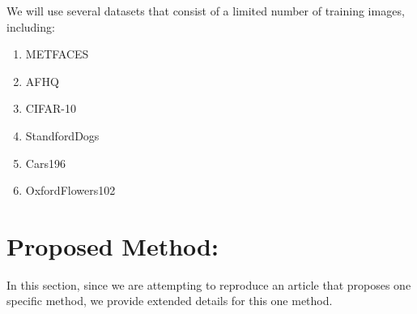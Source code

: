 \documentclass{report}
\begin{document}
We will use several datasets that consist of a limited number of training images, including: 
\begin{enumerate}
\item METFACES\cite{karras2020training} 
\item AFHQ\cite{choi2020stargan}
\item CIFAR-10\cite{krizhevsky2009learning}
\item StandfordDogs\cite{KhoslaYaoJayadevaprakashFeiFei_FGVC2011, imagenet_cvpr09}
\item Cars196\cite{KrauseStarkDengFei-Fei_3DRR2013}
\item OxfordFlowers102\cite{Nilsback08}
\end{enumerate}


\section{Proposed Method:}


In this section, since we are attempting to reproduce an article that proposes one specific method, we provide extended details for this one method.
\end{document}

